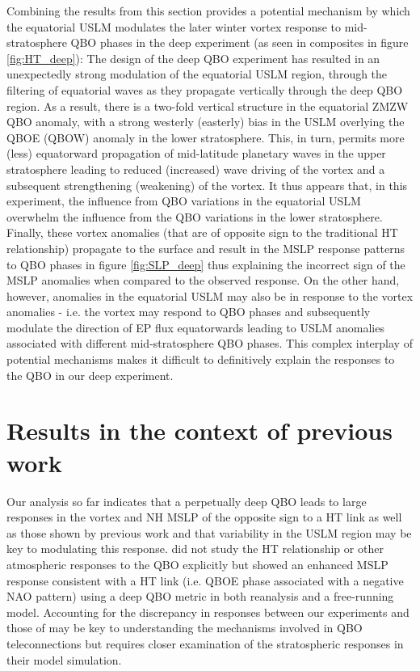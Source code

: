 Combining the results from this section provides a potential mechanism by which the equatorial USLM modulates the later winter vortex response to mid-stratosphere QBO phases in the deep experiment (as seen in composites in figure \ref{fig:HT_deep}): The design of the deep QBO experiment has resulted in an unexpectedly strong modulation of the equatorial USLM region, through the filtering of equatorial waves as they propagate vertically through the deep QBO region. As a result, there is a two-fold vertical structure in the equatorial ZMZW QBO anomaly, with a strong westerly (easterly) bias in the USLM overlying the QBOE (QBOW) anomaly in the lower stratosphere. This, in turn, permits more (less) equatorward propagation of mid-latitude planetary waves in the upper stratosphere leading to reduced (increased) wave driving of the vortex and a subsequent strengthening (weakening) of the vortex. It thus appears that, in this experiment, the influence from QBO variations in the equatorial USLM overwhelm the influence from the QBO variations in the lower stratosphere.  Finally, these vortex anomalies (that are of opposite sign to the traditional HT relationship) propagate to the surface and result in the MSLP response patterns to QBO phases in figure \ref{fig:SLP_deep} thus explaining the incorrect sign of the MSLP anomalies when compared to the observed response. On the other hand, however, anomalies in the equatorial USLM may also be in response to the vortex anomalies - i.e. the vortex may respond to QBO phases and subsequently modulate the direction of EP flux equatorwards leading to USLM anomalies associated with different mid-stratosphere QBO phases. This complex interplay of potential mechanisms makes it difficult to definitively explain the responses to the QBO in our deep experiment. 

\section{Results in the context of previous work}
Our analysis so far indicates that a perpetually deep QBO leads to large responses in the vortex and NH MSLP of the opposite sign to a HT link as well as those shown by previous work \citep{andrewsObserved2019d} and that variability in the USLM region may be key to modulating this response. \cite{andrewsObserved2019d} did not study the HT relationship or other atmospheric responses to the QBO explicitly but showed an enhanced MSLP response consistent with a HT link (i.e. QBOE phase associated with a negative NAO pattern) using a deep QBO metric in both reanalysis and a free-running model. Accounting for the discrepancy in responses between our experiments and those of \cite{andrewsObserved2019d} may be key to understanding the mechanisms involved in QBO teleconnections but requires closer examination of the stratospheric responses in their model simulation.

